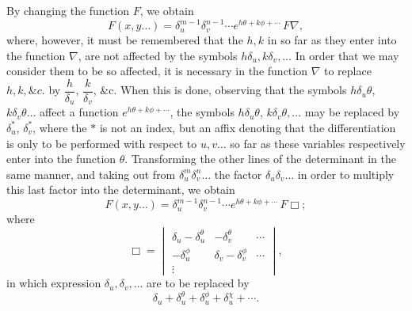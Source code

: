 \documentclass[11pt]{article}
\begin{document}
By changing the function $F$, we obtain
\[ F(x,y\ldots) = \delta_u^{m-1}\delta_v^{n-1}\cdots e^{h\theta + k\phi + \cdots}\, F\nabla, \]
where, however, it must be remembered that the $h,k$ in so far as they enter into the function $\nabla$, are not affected by the symbols $h\delta_u, k\delta_v,\ldots$ In order that we may consider them to be so affected, it is necessary in the function $\nabla$ to replace $h,k,\&c.$ by $\dfrac{h}{\delta_u}$, $\dfrac{k}{\delta_v}$, \&c. When this is done, observing that the symbols $h\delta_u\theta$, $k\delta_v\theta\ldots$ affect a function $e^{h\theta + k\phi + \cdots}$, the symbols $h\delta_u\theta$, $k\delta_v\theta,\ldots$ may be replaced by $\delta_u^\ast$, $\delta_v^\ast$, where the $\ast$ is not an index, but an affix denoting that the differentiation is only to be performed with respect to $u,v\ldots$ so far as these variables respectively enter into the function $\theta$. Transforming the other lines of the determinant in the same manner, and taking out from $\delta_u^{m}\delta_v^{n}\ldots$ the factor $\delta_u\delta_v\ldots$ in order to multiply this last factor into the determinant, we obtain
\[ F(x,y\ldots) = \delta_u^{m-1}\delta_v^{n-1}\cdots e^{h\theta + k\phi + \cdots}\, F\Box; \]
where
\[ \Box = \begin{vmatrix} \delta_u - \delta_u^\theta & -\delta_v^\theta & \cdots \\ -\delta_u^\phi & \delta_v - \delta_v^\phi & \cdots \\ \vdots & & \end{vmatrix}, \]
in which expression $\delta_u,\delta_v,\ldots$ are to be replaced by
\[ \delta_u + \delta_u^\theta + \delta_u^\phi + \delta_u^\chi + \cdots. \]
\end{document}
